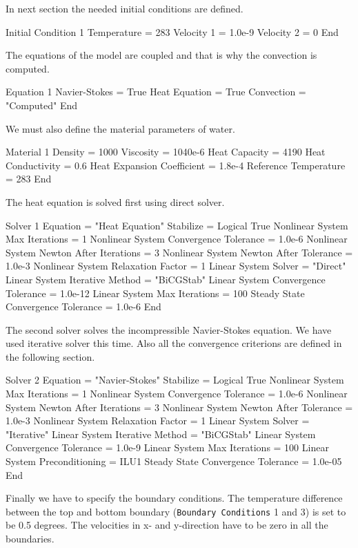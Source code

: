 \begin{flushleft}
In next section the needed initial conditions are defined.

\ttbegin
Initial Condition 1
  Temperature = 283
  Velocity 1 = 1.0e-9
  Velocity 2 = 0
End
\ttend

The equations of the model are coupled and that is why the convection is computed.

\ttbegin
Equation 1
  Navier-Stokes = True
  Heat Equation = True
  Convection = "Computed"
End
\ttend

We must also define the material parameters of water.

\ttbegin
Material 1
  Density = 1000
  Viscosity = 1040e-6
  Heat Capacity = 4190
  Heat Conductivity = 0.6
  Heat Expansion Coefficient = 1.8e-4
  Reference Temperature = 283
End
\ttend

The heat equation is solved first using direct solver. 

\ttbegin
Solver 1
  Equation = "Heat Equation"
  Stabilize = Logical True
  Nonlinear System Max Iterations = 1
  Nonlinear System Convergence Tolerance = 1.0e-6
  Nonlinear System Newton After Iterations = 3 
  Nonlinear System Newton After Tolerance = 1.0e-3
  Nonlinear System Relaxation Factor = 1
  Linear System Solver = "Direct"
  Linear System Iterative Method = "BiCGStab"
  Linear System Convergence Tolerance = 1.0e-12
  Linear System Max Iterations = 100
  Steady State Convergence Tolerance = 1.0e-6
End
\ttend

The second solver solves the incompressible Navier-Stokes equation. We have used iterative solver this time. Also all the convergence criterions are defined in the following section.  

\ttbegin
Solver 2
 Equation = "Navier-Stokes"
 Stabilize = Logical True
 Nonlinear System Max Iterations = 1
 Nonlinear System Convergence Tolerance = 1.0e-6
 Nonlinear System Newton After Iterations = 3
 Nonlinear System Newton After Tolerance = 1.0e-3
 Nonlinear System Relaxation Factor = 1
 Linear System Solver = "Iterative"
 Linear System Iterative Method = "BiCGStab"
 Linear System Convergence Tolerance = 1.0e-9
 Linear System Max Iterations = 100
 Linear System Preconditioning = ILU1
 Steady State Convergence Tolerance = 1.0e-05
End
\ttend

Finally we have to specify the boundary conditions. The temperature difference between the top and bottom boundary ({\tt Boundary Conditions} 1 and 3) is set to be 0.5 degrees. The velocities in x- and y-direction have to be zero in all the boundaries.


\end{flushleft}
